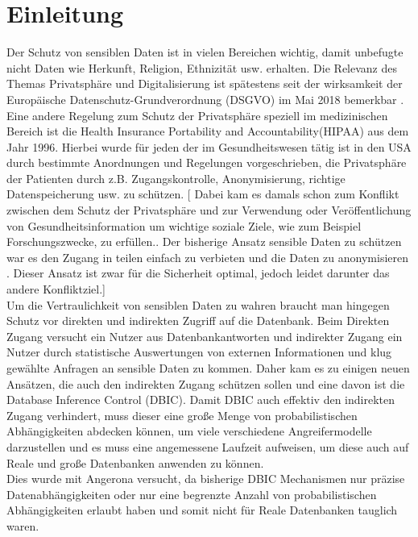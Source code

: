 \documentclass[german,version-2020-11]{uzl-thesis}
\begin{document}
\chapter{Einleitung}
Der Schutz von sensiblen Daten ist in vielen Bereichen wichtig, damit unbefugte nicht Daten wie Herkunft, Religion, Ethnizität usw. erhalten. Die Relevanz des Themas Privatsphäre und Digitalisierung ist spätestens seit der wirksamkeit der Europäische Datenschutz-Grundverordnung (DSGVO) im  Mai 2018 bemerkbar \cite{1}. Eine andere Regelung zum Schutz der Privatsphäre speziell im medizinischen Bereich ist die Health Insurance Portability and Accountability(HIPAA) aus dem Jahr 1996. Hierbei wurde für jeden der im Gesundheitswesen tätig ist in den USA durch bestimmte Anordnungen und Regelungen vorgeschrieben, die Privatsphäre der Patienten durch z.B. Zugangskontrolle, Anonymisierung, richtige Datenspeicherung usw. zu schützen. \cite{7}[ Dabei kam es damals schon zum Konflikt zwischen dem Schutz der Privatsphäre und zur Verwendung oder Veröffentlichung von Gesundheitsinformation um wichtige soziale Ziele, wie zum Beispiel Forschungszwecke, zu erfüllen.\cite{8}. Der bisherige Ansatz sensible Daten zu schützen war es den Zugang in teilen einfach zu verbieten und die Daten zu anonymisieren \cite{2}. Dieser Ansatz ist zwar für die Sicherheit optimal, jedoch leidet darunter das andere Konfliktziel.] \\ 
Um die Vertraulichkeit von sensiblen Daten zu wahren braucht man hingegen Schutz vor direkten und indirekten Zugriff auf die Datenbank. Beim Direkten Zugang versucht ein Nutzer aus Datenbankantworten und indirekter Zugang ein Nutzer durch statistische Auswertungen von externen Informationen und klug gewählte Anfragen an sensible Daten zu kommen.  Daher kam es zu einigen neuen Ansätzen, die auch den indirekten Zugang schützen sollen und eine davon ist die Database Inference Control (DBIC). Damit DBIC auch effektiv den indirekten Zugang verhindert, muss dieser eine große Menge von probabilistischen Abhängigkeiten abdecken können, um viele verschiedene Angreifermodelle darzustellen und es muss eine angemessene Laufzeit aufweisen, um diese auch auf Reale und große Datenbanken anwenden zu können.\\
Dies wurde mit Angerona versucht, da bisherige DBIC Mechanismen nur präzise Datenabhängigkeiten oder nur eine begrenzte Anzahl von probabilistischen Abhängigkeiten erlaubt haben und somit nicht für Reale Datenbanken tauglich waren. \cite{6}
\\ \\
\end{document}
